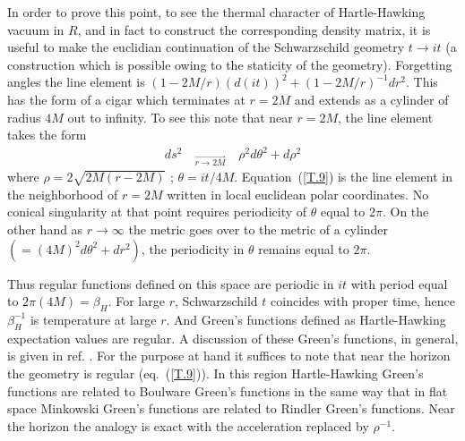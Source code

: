 \documentclass[12pt,oneside]{report}
\begin{document}
In order to prove this point, to see the thermal character of Hartle-Hawking
vacuum in $ R $, and in fact to construct the corresponding density matrix, it is
useful to make the euclidian continuation of the Schwarzschild geometry $ t \to it
$ (a construction which is possible owing to the staticity of the geometry). 
Forgetting angles the line
element is $ (1 - {2 M / r}) (d (it))^2 + ( 1 - 2
M/r)^{-1} dr^2 $. This has the form of a cigar which terminates at $ r = 2
M $ and extends as a cylinder of radius $ 4 M $ out to infinity. To
see this note that near $ r = 2 M $, the line element takes the
form \begin{eqnarray}
ds^2 \quad _{\stackrel {\longrightarrow}{r \to 2 M}} \quad \rho^2 d
\theta^2 + d \rho^2 
\label {T.9}
\end{eqnarray}
where $ \rho = 2 \sqrt{ 2 M (r - 2 M)}$ ; $ \theta = it/{4 M} $.
Equation~(\ref{T.9}) is the line element in the neighborhood of $r=2M$ written
in local euclidean polar coordinates. No conical singularity at that point
requires periodicity of $ \theta $ equal to $ 2 \pi $. On the other hand as
$ r \to \infty $ the metric goes over to the metric of a cylinder $ ( = (4
M) ^2 d \theta ^2 + d r^2) $, the periodicity in $ \theta $ remains equal
to  $ 2 \pi $.

Thus regular functions defined on this space are periodic in $ it
$ with period equal to $ 2 \pi (4 M) = \beta_H $. For large $ r $,
Schwarzschild $ t $ coincides with proper time, hence
$\beta_{H}^{-1}$ is temperature at large $ r $. And Green's
functions defined as Hartle-Hawking expectation values are regular.
A discussion of these Green's functions, in general, is given in ref.
 \cite{FuRu}. For the purpose at hand it suffices to note that
near the horizon the geometry is regular (eq.~(\ref{T.9})). In this
region Hartle-Hawking Green's functions are related to Boulware Green's
functions in the same way that in flat space Minkowski Green's functions
are related to Rindler Green's functions. Near the horizon the analogy is
exact with the acceleration replaced by $\rho^{-1}$.
\end{document}
